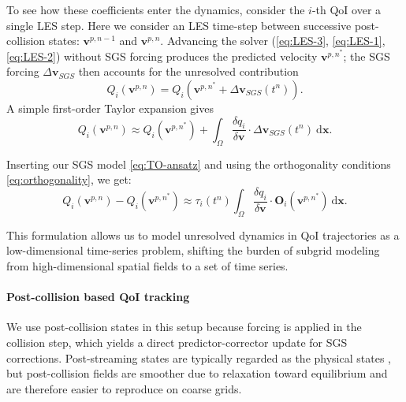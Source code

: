 \documentclass[]{elsarticle}
\newcommand{\D}{\mathrm{d}}
\begin{document}
To see how these coefficients enter the dynamics, consider the $i$-th QoI over a single LES step. Here we consider an LES time-step between successive post-collision states: $\boldsymbol{v}^{p,n-1}$ and $\boldsymbol{v}^{p,n}$. Advancing the solver (\eqref{eq:LES-3}, \eqref{eq:LES-1}, \eqref{eq:LES-2}) without SGS forcing produces the predicted velocity $\boldsymbol{v}^{p,n^*}$; the SGS forcing $\Delta \boldsymbol{v}_{SGS}$ then accounts for the unresolved contribution
\begin{equation}
    Q_i(\boldsymbol{v}^{p,n}) = Q_i(\boldsymbol{v}^{p,n^*}+\Delta \boldsymbol{v}_{SGS}(t^{n})). 
\end{equation}
A simple first-order Taylor expansion gives
\begin{equation}
    Q_i(\boldsymbol{v}^{p,n}) \approx Q_i(\boldsymbol{v}^{p,n^*})+ \int_\Omega \frac{\delta q_i}{\delta \boldsymbol{v}} \cdot \Delta \boldsymbol{v}_{SGS}(t^{n}) \ \D \boldsymbol{x}. 
\end{equation}

Inserting our SGS model \eqref{eq:TO-ansatz} and using the orthogonality conditions \eqref{eq:orthogonality}, we get:
\begin{equation}\label{eq:influence-SGS-term-on-LF-QoI-trajectories}
    Q_i(\boldsymbol{v}^{p,n}) - Q_i(\boldsymbol{v}^{p,n^*}) \approx
    \tau_i(t^n) \int_\Omega \frac{\delta q_i}{\delta \boldsymbol{v}} \cdot \boldsymbol{O}_i(\boldsymbol{v}^{p,n^*}) \ \D \boldsymbol{x}. 
\end{equation}

This formulation allows us to model unresolved dynamics in QoI trajectories as a low-dimensional time-series problem, shifting the burden of subgrid modeling from high-dimensional spatial fields to a set of time series.

\paragraph{Post-collision based QoI tracking}
We use post-collision states in this setup because forcing is applied in the collision step, which yields a direct predictor-corrector update for SGS corrections. Post-streaming states are typically regarded as the physical states \cite{kruger_lattice_2017}, but post-collision fields are smoother due to relaxation toward equilibrium and are therefore easier to reproduce on coarse grids.
\end{document}

